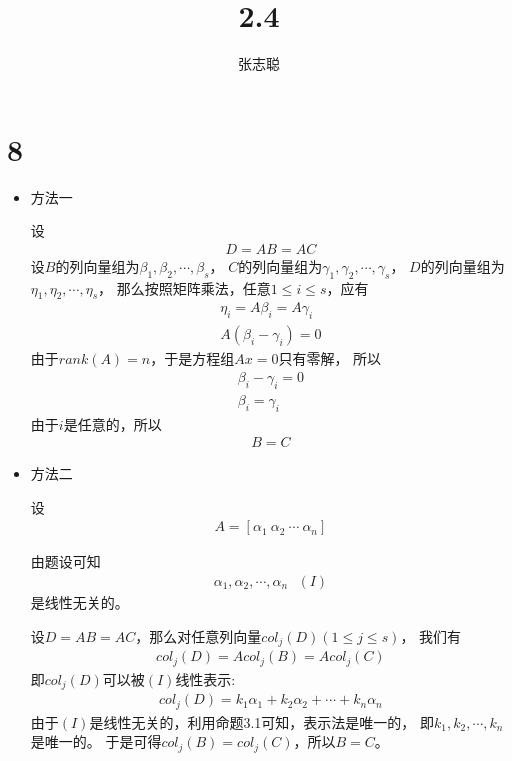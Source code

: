 \documentclass{article}
\begin{document}
\title{2.4}
\author{张志聪}
\maketitle

\section*{8}

\begin{itemize}
  \item 方法一

        设
        \begin{align*}
          D = A B = A C
        \end{align*}
        设$B$的列向量组为$\beta_1, \beta_2, \cdots, \beta_s$，
        $C$的列向量组为$\gamma_1, \gamma_2, \cdots, \gamma_s$，
        $D$的列向量组为$\eta_1, \eta_2, \cdots, \eta_s$，
        那么按照矩阵乘法，任意$1 \leq i \leq s$，应有
        \begin{align*}
          \eta_i = A \beta_i = A \gamma_i \\
          A (\beta_i - \gamma_i) = 0
        \end{align*}
        由于$rank(A) = n$，于是方程组$A x = 0$只有零解，
        所以
        \begin{align*}
          \beta_i - \gamma_i = 0 \\
          \beta_i = \gamma_i
        \end{align*}
        由于$i$是任意的，所以
        \begin{align*}
          B = C
        \end{align*}

  \item 方法二

        设
        \begin{align*}
          A = [\alpha_1 \ \alpha_2 \ \cdots \  \alpha_n]
        \end{align*}

        由题设可知
        \begin{align*}
          \alpha_1, \alpha_2, \cdots, \alpha_n \ \ \ (I)
        \end{align*}
        是线性无关的。

        设$D = AB = AC$，那么对任意列向量$col_j(D) (1 \leq j \leq s)$，
        我们有
        \begin{align*}
          col_j(D) = A col_j(B) = A col_j(C)
        \end{align*}
        即$col_j(D)$可以被$(I)$线性表示:
        \begin{align*}
          col_j(D) = k_1 \alpha_1 + k_2 \alpha_2 + \cdots + k_n \alpha_n
        \end{align*}
        由于$(I)$是线性无关的，利用命题3.1可知，表示法是唯一的，
        即$k_1, k_2, \cdots, k_n$是唯一的。
        于是可得$col_j(B) = col_j(C)$，所以$B = C$。
\end{itemize}
\end{document}
